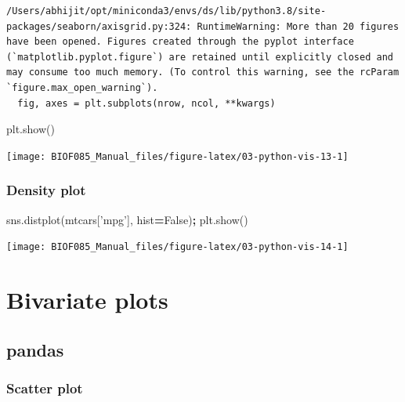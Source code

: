 \documentclass[
  letterpaper,
]{scrbook}
\newenvironment{Shaded}{\begin{snugshade}}{\end{snugshade}}
\newcommand{\NormalTok}[1]{#1}
\newcommand{\OperatorTok}[1]{\textcolor[rgb]{0.81,0.36,0.00}{\textbf{#1}}}
\newcommand{\StringTok}[1]{\textcolor[rgb]{0.31,0.60,0.02}{#1}}
\newcommand{\VariableTok}[1]{\textcolor[rgb]{0.00,0.00,0.00}{#1}}
\begin{document}
\begin{verbatim}
/Users/abhijit/opt/miniconda3/envs/ds/lib/python3.8/site-packages/seaborn/axisgrid.py:324: RuntimeWarning: More than 20 figures have been opened. Figures created through the pyplot interface (`matplotlib.pyplot.figure`) are retained until explicitly closed and may consume too much memory. (To control this warning, see the rcParam `figure.max_open_warning`).
  fig, axes = plt.subplots(nrow, ncol, **kwargs)
\end{verbatim}

\begin{Shaded}
\begin{Highlighting}[]
\NormalTok{plt.show()}
\end{Highlighting}
\end{Shaded}

\begin{center}\texttt{[image: BIOF085\_Manual\_files/figure-latex/03-python-vis-13-1]} \end{center}

\hypertarget{density-plot-1}{%
\subsubsection{Density plot}\label{density-plot-1}}

\begin{Shaded}
\begin{Highlighting}[]
\NormalTok{sns.distplot(mtcars[}\StringTok{'mpg'}\NormalTok{], hist}\OperatorTok{=}\VariableTok{False}\NormalTok{)}\OperatorTok{;}
\NormalTok{plt.show()}
\end{Highlighting}
\end{Shaded}

\begin{center}\texttt{[image: BIOF085\_Manual\_files/figure-latex/03-python-vis-14-1]} \end{center}

\hypertarget{bivariate-plots}{%
\section{Bivariate plots}\label{bivariate-plots}}

\hypertarget{pandas-1}{%
\subsection{pandas}\label{pandas-1}}

\hypertarget{scatter-plot}{%
\subsubsection{Scatter plot}\label{scatter-plot}}
\end{document}

